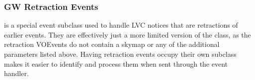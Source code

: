\begin{colsection}
\subsubsection{GW Retraction Events}

 is a special event subclass used to handle LVC notices that are retractions of earlier events. They are effectively just a more limited version of the  class, as the retraction VOEvents do not contain a skymap or any of the additional parameters listed above. Having retraction events occupy their own subclass makes it easier to identify and process them when sent through the event handler.

\newpage

\end{colsection}


